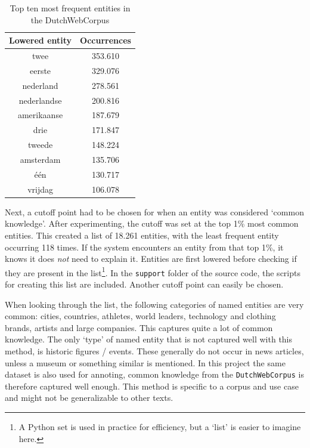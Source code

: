 \documentclass[
10pt, %
a4paper, %
oneside, %
headinclude,footinclude, %
] {book}%
\begin{document}
\begin{table}[hbtp]\centering
  \caption{Top ten most frequent entities in the DutchWebCorpus\label{table:entity_counts}}
  \begin{tabular}{cc}
    Lowered entity & Occurrences \\
    \hline
    twee           & 353.610     \\
    eerste         & 329.076     \\
    nederland      & 278.561     \\
    nederlandse    & 200.816     \\
    amerikaanse    & 187.679     \\
    drie           & 171.847     \\
    tweede         & 148.224     \\
    amsterdam      & 135.706     \\
    één            & 130.717     \\
    vrijdag        & 106.078     \\
  \end{tabular}
\end{table}

Next, a cutoff point had to be chosen for when an entity was considered `common knowledge'.
After experimenting, the cutoff was set at the top 1\% most common entities.
This created a list of 18.261 entities, with the least frequent entity occurring 118 times.
If the system encounters an entity from that top 1\%, it knows it does \textit{not} need to explain it.
Entities are first lowered before checking if they are present in the list\footnote{A Python set is used in practice for efficiency, but a `list' is easier to imagine here.}.
In the \verb+support+ folder of the source code, the scripts for creating this list are included.
Another cutoff point can easily be chosen.

When looking through the list, the following categories of named entities are very common: cities, countries, athletes, world leaders, technology and clothing brands, artists and large companies.
This captures quite a lot of common knowledge.
The only `type' of named entity that is not captured well with this method, is historic figures / events.
These generally do not occur in news articles, unless a museum or something similar is mentioned.
In this project the same dataset is also used for annoting, common knowledge from the \verb+DutchWebCorpus+ is therefore captured well enough.
This method is specific to a corpus and use case and might not be generalizable to other texts.
\end{document}
